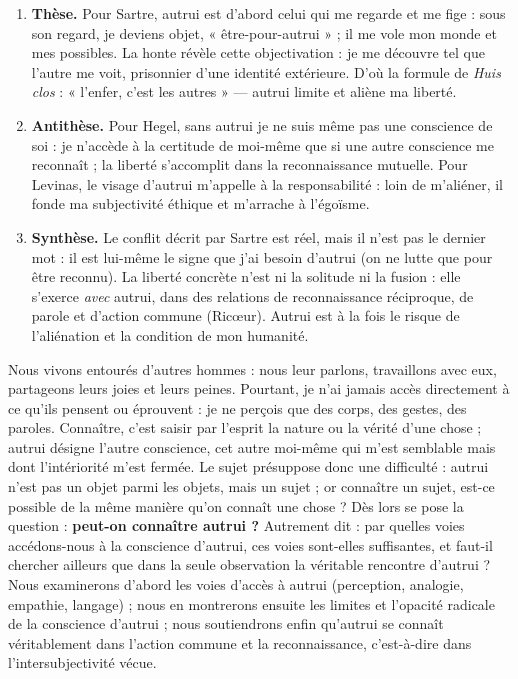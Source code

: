 \documentclass[11pt]{article}
\begin{document}
\begin{corrige}
\begin{enumerate}
    \item \textbf{Thèse.} Pour Sartre, autrui est d'abord celui qui me regarde et me fige : sous son regard, je deviens objet, « être-pour-autrui » ; il me vole mon monde et mes possibles. La honte révèle cette objectivation : je me découvre tel que l'autre me voit, prisonnier d'une identité extérieure. D'où la formule de \emph{Huis clos} : « l'enfer, c'est les autres » — autrui limite et aliène ma liberté.
    \item \textbf{Antithèse.} Pour Hegel, sans autrui je ne suis même pas une conscience de soi : je n'accède à la certitude de moi-même que si une autre conscience me reconnaît ; la liberté s'accomplit dans la reconnaissance mutuelle. Pour Levinas, le visage d'autrui m'appelle à la responsabilité : loin de m'aliéner, il fonde ma subjectivité éthique et m'arrache à l'égoïsme.
    \item \textbf{Synthèse.} Le conflit décrit par Sartre est réel, mais il n'est pas le dernier mot : il est lui-même le signe que j'ai besoin d'autrui (on ne lutte que pour être reconnu). La liberté concrète n'est ni la solitude ni la fusion : elle s'exerce \emph{avec} autrui, dans des relations de reconnaissance réciproque, de parole et d'action commune (Ricœur). Autrui est à la fois le risque de l'aliénation et la condition de mon humanité.
\end{enumerate}
\end{corrige}

\begin{corrige}
Nous vivons entourés d'autres hommes : nous leur parlons, travaillons avec eux, partageons leurs joies et leurs peines. Pourtant, je n'ai jamais accès directement à ce qu'ils pensent ou éprouvent : je ne perçois que des corps, des gestes, des paroles. Connaître, c'est saisir par l'esprit la nature ou la vérité d'une chose ; autrui désigne l'autre conscience, cet autre moi-même qui m'est semblable mais dont l'intériorité m'est fermée. Le sujet présuppose donc une difficulté : autrui n'est pas un objet parmi les objets, mais un sujet ; or connaître un sujet, est-ce possible de la même manière qu'on connaît une chose ? Dès lors se pose la question : \textbf{peut-on connaître autrui ?} Autrement dit : par quelles voies accédons-nous à la conscience d'autrui, ces voies sont-elles suffisantes, et faut-il chercher ailleurs que dans la seule observation la véritable rencontre d'autrui ? Nous examinerons d'abord les voies d'accès à autrui (perception, analogie, empathie, langage) ; nous en montrerons ensuite les limites et l'opacité radicale de la conscience d'autrui ; nous soutiendrons enfin qu'autrui se connaît véritablement dans l'action commune et la reconnaissance, c'est-à-dire dans l'intersubjectivité vécue.
\end{corrige}
\end{document}
